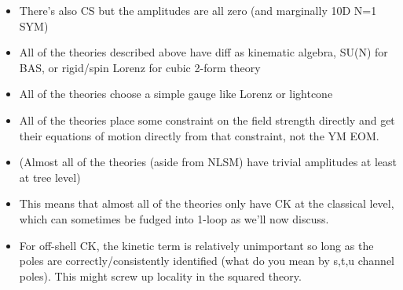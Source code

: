 \documentclass[11pt,letter]{article}
\begin{document}
\begin{itemize}
\item There's also CS but the amplitudes are all zero (and marginally 10D N=1 SYM)
\item All of the theories described above have diff as kinematic algebra, SU(N) for BAS, or rigid/spin Lorenz for cubic 2-form theory
\item All of the theories choose a simple gauge like Lorenz or lightcone
\item All of the theories place some constraint on the field strength directly and get their equations of motion directly from that constraint, not the YM EOM.
\item (Almost all of the theories (aside from NLSM) have trivial amplitudes at least at tree level)
\item This means that almost all of the theories only have CK at the classical level, which can sometimes be fudged into 1-loop as we'll now discuss.
\item For off-shell CK, the kinetic term is relatively unimportant so long as the poles are correctly/consistently identified (what do you mean by s,t,u channel poles).  This might screw up locality in the squared theory.
\end{itemize}




\end{document}
